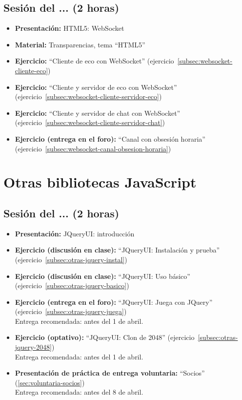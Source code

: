 \documentclass[a4paper,12pt]{report}
\begin{document}
\subsection{Sesión del ... (2 horas)}

\begin{itemize}
 \item \textbf{Presentación:} HTML5: WebSocket
 \item \textbf{Material:} Transparencias, tema ``HTML5''
 \item \textbf{Ejercicio:} ``Cliente de eco con WebSocket'' (ejercicio~\ref{subsec:websocket-cliente-eco})
 \item \textbf{Ejercicio:} ``Cliente y servidor de eco con WebSocket'' (ejercicio~\ref{subsec:websocket-cliente-servidor-eco})
 \item \textbf{Ejercicio:} ``Cliente y servidor de chat con WebSocket'' (ejercicio~\ref{subsec:websocket-cliente-servidor-chat})
 \item \textbf{Ejercicio (entrega en el foro):} ``Canal con obsesión horaria'' (ejercicio~\ref{subsec:websocket-canal-obsesion-horaria})
\end{itemize}


\section{Otras bibliotecas JavaScript}

\subsection{Sesión del ... (2 horas)}

\begin{itemize}
\item \textbf{Presentación:} JQueryUI: introducción
\item \textbf{Ejercicio (discusión en clase):} ``JQueryUI: Instalación y prueba'' (ejercicio~\ref{subsec:otras-jquery-instal})
\item \textbf{Ejercicio (discusión en clase):} ``JQueryUI: Uso básico'' (ejercicio~\ref{subsec:otras-jquery-basico}) \\
\item \textbf{Ejercicio (entrega en el foro):} ``JQueryUI: Juega con JQuery'' (ejercicio~\ref{subsec:otras-jquery-juega}) \\
  Entrega recomendada: antes del 1 de abril.
\item \textbf{Ejercicio (optativo):} ``JQueryUI: Clon de 2048'' (ejercicio~\ref{subsec:otras-jquery-2048}) \\
  Entrega recomendada: antes del 1 de abril.
\item \textbf{Presentación de práctica de entrega voluntaria:} ``Socios'' (\ref{sec:voluntaria-socios}) \\
  Entrega recomendada: antes del 8 de abril.
\end{itemize}
\end{document}
